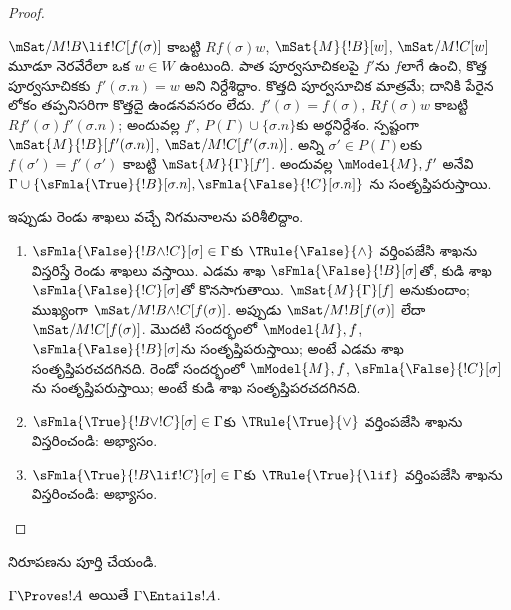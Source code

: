 \documentclass[../../../include/open-logic-section]{subfiles}
\begin{document}
\begin{proof}
\begin{enumerate}
  $\mSat/{M}{!B \lif !C}[f(\sigma)]$
  కాబట్టి $Rf(\sigma)w$,
  $\mSat{M}{!B}[w]$,
  $\mSat/{M}{!C}[w]$ మూడూ నెరవేరేలా
  ఒక $w \in W$ ఉంటుంది. పాత పూర్వసూచికలపై $f'$ను $f$లాగే
  ఉంచి, కొత్త పూర్వసూచికకు $f'(\sigma.n)
  = w$ అని నిర్దేశిద్దాం.
  కొత్తది పూర్వసూచిక మాత్రమే; దానికి పేరైన
  లోకం తప్పనిసరిగా కొత్తదై ఉండనవసరం లేదు.
  $f'(\sigma) = f(\sigma)$,
  $Rf(\sigma)w$ కాబట్టి
  $Rf'(\sigma)f'(\sigma.n)$;
  అందువల్ల $f'$,
  $P(\Gamma) \cup \{\sigma.n\}$కు
  అర్థనిర్దేశం. స్పష్టంగా
  $\mSat{M}{!B}[f'(\sigma.n)]$,
  $\mSat/{M}{!C}[f'(\sigma.n)]$.
  అన్ని $\sigma' \in
  P(\Gamma)$లకు $f(\sigma') = f'(\sigma')$
  కాబట్టి $\mSat{M}{\Gamma}[f']$.
  అందువల్ల $\mModel{M}, f'$
  అనేవి $\Gamma \cup
  \{\sFmla{\True}{!B}[\sigma.n],
    \sFmla{\False}{!C}[\sigma.n]\}$
  ను సంతృప్తిపరుస్తాయి.
\end{enumerate}
ఇప్పుడు రెండు శాఖలు వచ్చే నిగమనాలను
పరిశీలిద్దాం.
\begin{enumerate}
\item $\sFmla{\False}{!B \land !C}[\sigma] \in \Gamma$కు
  $\TRule{\False}{\land}$ వర్తింపజేసి శాఖను
  విస్తరిస్తే రెండు శాఖలు వస్తాయి.
  ఎడమ శాఖ $\sFmla{\False}{!B}[\sigma]$తో,
  కుడి శాఖ $\sFmla{\False}{!C}[\sigma]$తో
  కొనసాగుతాయి. $\mSat{M}{\Gamma}[f]$
  అనుకుందాం; ముఖ్యంగా
  $\mSat/{M}{!B \land !C}[f(\sigma)]$.
  అప్పుడు $\mSat/{M}{!B}[f(\sigma)]$
  లేదా $\mSat/{M}{!C}[f(\sigma)]$.
  మొదటి సందర్భంలో $\mModel{M}, f$,
  $\sFmla{\False}{!B}[\sigma]$ను
  సంతృప్తిపరుస్తాయి; అంటే ఎడమ శాఖ
  సంతృప్తిపరచదగినది. రెండో సందర్భంలో
  $\mModel{M}, f$,
  $\sFmla{\False}{!C}[\sigma]$ను
  సంతృప్తిపరుస్తాయి; అంటే కుడి శాఖ
  సంతృప్తిపరచదగినది.
\item $\sFmla{\True}{!B \lor !C}[\sigma] \in \Gamma$కు
    $\TRule{\True}{\lor}$ వర్తింపజేసి
    శాఖను విస్తరించండి: అభ్యాసం.
\item $\sFmla{\True}{!B \lif !C}[\sigma] \in \Gamma$కు
    $\TRule{\True}{\lif}$ వర్తింపజేసి
    శాఖను విస్తరించండి: అభ్యాసం.
\end{enumerate}
\end{proof}

\begin{prob}
నిరూపణను పూర్తి చేయండి.
\end{prob}

\begin{cor}
$\Gamma \Proves !A$ అయితే
$\Gamma \Entails !A$.
\end{cor}
\end{document}

